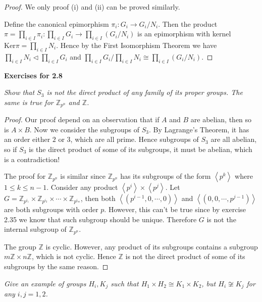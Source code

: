 \begin{proof}
We only proof (i) and (ii) can be proved similarly.\par
Define the canonical epimorphism $\pi_i:G_i\to G_i/N_i$. Then the product $\pi =\prod_{i\in I}{\pi _i}:\prod_{i\in I}{G_i}\rightarrow \prod_{i\in I}{\left( G_i/N_i \right)}$ is an epimorphism with kernel $\mathrm{Ker}\pi=\prod_{i\in I}N_i$. Hence by the First Isomorphism Theorem we have $\prod_{i\in I}{N_i}\lhd \prod_{i\in I}{G_i}$ and $\prod_{i\in I}{G_i}/\prod_{i\in I}{N_i}\cong \prod_{i\in I}{\left( G_i/N_i \right)}$.
\end{proof}
\begin{center}
\begin{large}
    \textbf{Exercises for 2.8}
\end{large}
\end{center}
\begin{problem}\em
Show that $S_3$ is not the direct product of any family of its proper groups. The same is true for $\mathbb{Z}_{p^n}$ and $\mathbb{Z}$.
\end{problem}
\begin{proof}
Our proof depend on an observation that if $A$ and $B$ are abelian, then so is $A\times B$. Now we consider the subgroups of $S_3$. By Lagrange's Theorem, it has an order either $2$ or $3$, which are all prime. Hence subgroups of $S_3$ are all abelian, so if $S_3$ is the direct product of some of its subgroups, it must be abelian, which is a contradiction!\par
The proof for $\mathbb{Z}_{p^n}$ is similar since $\mathbb{Z}_{p^n}$ has its subgroups of the form $\left<p^k\right>$ where $1\le k\le n-1$. Consider any product $\left<p^i\right>\times\left<p^j\right>$. Let $G=\mathbb{Z}_{p^{i_1}}\times\mathbb{Z}_{p^{i_2}}\times\cdots\times\mathbb{Z}_{p^{i_m}}$, then both $\left<(p^{i-1},0,\cdots,0)\right>$ and $\left<(0,0,\cdots,p^{j-1})\right>$ are both subgroups with order $p$. However, this can't be true since by exercise 2.35 we know that such subgroup should be unique. Therefore $G$ is not the internal subgroup of $\mathbb{Z}_{p^n}$.\par
The group $\mathbb{Z}$ is cyclic. However, any product of its subgroups contains a subgroup $m\mathbb{Z}\times n\mathbb{Z}$, which is not cyclic. Hence $\mathbb{Z}$ is not the direct product of some of its subgroups by the same reason.
\end{proof}
\begin{problem}\em
Give an example of groups $H_i,K_j$ such that $H_1\times H_2\cong K_1\times K_2$, but $H_i\not\cong K_j$ for any $i,j=1,2$.
\end{problem}
